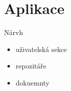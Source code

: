 \documentclass[czech,aspectratio=169]{beamer}
\begin{document}
\section{Aplikace}
    \begin{frame}
        \tableofcontents[currentsection]
    \end{frame}
    \begin{frame}{Nárvh}
        \begin{itemize}
            \item uživatelská sekce \pause{}
            \item repozitáře \pause{}
            \item dokuemnty
        \end{itemize}
    \end{frame}
\end{document}
